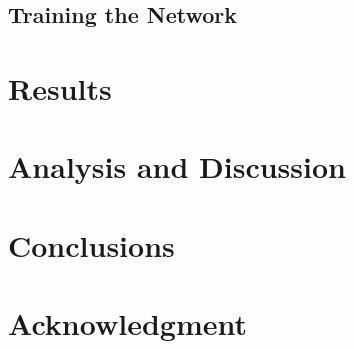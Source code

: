 \documentclass[conference]{IEEEtran}
\begin{document}
\subsection{Training the Network}

\section{Results}

\section{Analysis and Discussion}

\section{Conclusions}

\section*{Acknowledgment}


\end{document}
